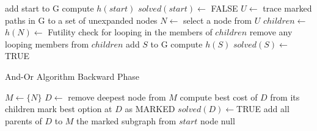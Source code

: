 \documentclass[a4paper]{article}
\begin{document}
\begin{itemize}
\begin{algorithm}[H]
\begin{algorithmic}[1]
            \Statex {}
            \State add start to G
            \State compute $h(start)$
            \State $solved(start)\gets $ FALSE
                \State $U\gets$ trace marked paths in G to a set of unexpanded nodes
                \State $N\gets$ select a node from $U$
                \State $children\gets$ 
                    \State $h(N)\gets$ Futility
                \Else 
                    \State check for looping in the members of $children$
                    \State remove any looping members from $children$
                        \State add $S$ to G
                        \State compute $h(S)$
                            \State $solved(S)\gets$ TRUE
                        \EndIf
                    \EndFor
                \EndIf
        \end{algorithmic}
    \end{algorithm}
    \begin{algorithm}[H]
        \caption{And-Or Algorithm Backward Phase}
        \begin{algorithmic}[1]
                \State $M\gets \{N\}$ 
                    \State $D\gets$ remove deepest node from $M$
                    \State compute best cost of $D$ from its children
                    \State mark best option at $D$ as MARKED
                        \State $solved(D)\gets $TRUE
                    \EndIf
                        \State add all parents of $D$ to $M$
                    \EndIf
                \EndWhile
            \EndWhile
                \State \Return the marked subgraph from $start$ node
            \EndIf
            \State \Return null
        \end{algorithmic}
    \end{algorithm}
\end{itemize}
\end{document}
